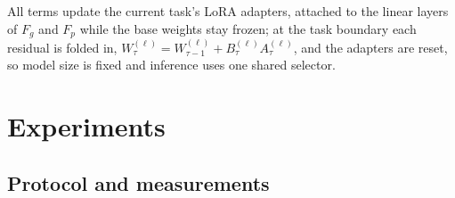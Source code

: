 \documentclass{article}
\newcommand{\Fg}{F_g}
\newcommand{\Fp}{F_p}
\begin{document}
All terms update the current task's LoRA adapters, attached to the linear layers of $\Fg$ and $\Fp$ while the base weights stay frozen; at the task boundary each residual is folded in, $W^{(\ell)}_{\tau}=W^{(\ell)}_{\tau-1}+B^{(\ell)}_\tau A^{(\ell)}_\tau$, and the adapters are reset, so model size is fixed and inference uses one shared selector.

\section{Experiments}
\label{sec:exp}

\subsection{Protocol and measurements}
\end{document}
